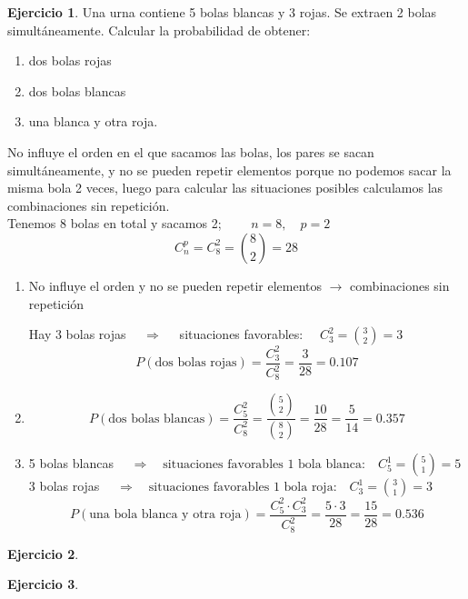 \documentclass[a4paper, 12pt]{article}
\theoremstyle{definition}
\newtheorem{ej}{Ejercicio}
\begin{document}
\begin{ej}
Una urna contiene 5 bolas blancas y 3 rojas. Se extraen 2 bolas simultáneamente. Calcular la
probabilidad de obtener:
\begin{enumerate}[label=\textit{\alph*)}]
\item dos bolas rojas
\item dos bolas blancas
\item una blanca y otra roja.
\end{enumerate}

No influye el orden en el que sacamos las bolas, los pares se sacan simultáneamente, y no se pueden repetir elementos porque no podemos sacar la misma bola 2 veces, luego para calcular las situaciones posibles calculamos las combinaciones sin repetición. \\
Tenemos 8 bolas en total y sacamos 2; $\qquad n=8 , \quad p=2$
\[C^p_n = C^2_8 = \binom{8}{2} = 28\]
\begin{enumerate}[label=\textit{\alph*)}]
\item No influye el orden y no se pueden repetir elementos $\longrightarrow$ combinaciones sin repetición

Hay 3 bolas rojas $\quad\Longrightarrow\quad$ situaciones favorables: $\quad C_3^2 = \binom{3}{2} = 3$
\[P(\text{dos bolas rojas}) = \frac{C_3^2}{C_8^2} = \frac{3}{28} = 0.107\]
\item \[P(\text{dos bolas blancas}) = \frac{C_5^2}{C_8^2} = \frac{\binom{5}{2}}{\binom{8}{2}} = \frac{10}{28} = \frac{5}{14} = 0.357\]
\item 5 bolas blancas $\quad\Longrightarrow\quad \text{situaciones favorables 1 bola blanca:}\quad C_5^1 = \binom{5}{1} = 5$ \\
3 bolas rojas $\quad\Longrightarrow\quad \text{situaciones favorables 1 bola roja:}\quad C_3^1 = \binom{3}{1} = 3$
\[P(\text{una bola blanca y otra roja}) = \frac{C_5^2 \cdot C_3^2}{C_8^2} = \frac{5\cdot3}{28} = \frac{15}{28} = 0.536\]
\end{enumerate}

\end{ej}

\medskip

\begin{ej}
\end{ej}

\begin{ej}
\end{ej}

\medskip
\end{document}
